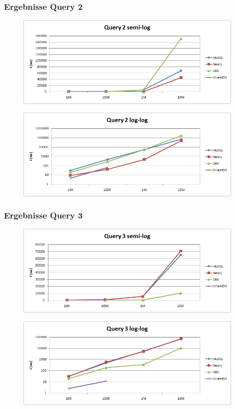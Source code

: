 \documentclass{beamer}
\begin{document}
\begin{frame}\frametitle{Ergebnisse Query 2}
\begin{figure}[ht]
\centering
\includegraphics[scale=0.3]{../results/cold caches/images/query2_semi-log}
\label{fig:mysql_schema}
\end{figure}
\begin{figure}[ht]
\centering
\includegraphics[scale=0.3]{../results/cold caches/images/query2_log-log}
\label{fig:mysql_schema}
\end{figure}
\end{frame}

\begin{frame}\frametitle{Ergebnisse Query 3}
\begin{figure}[ht]
\centering
\includegraphics[scale=0.3]{../results/cold caches/images/query3_semi-log}
\label{fig:mysql_schema}
\end{figure}
\begin{figure}[ht]
\centering
\includegraphics[scale=0.3]{../results/cold caches/images/query3_log-log}
\label{fig:mysql_schema}
\end{figure}
\end{frame}
\end{document}
